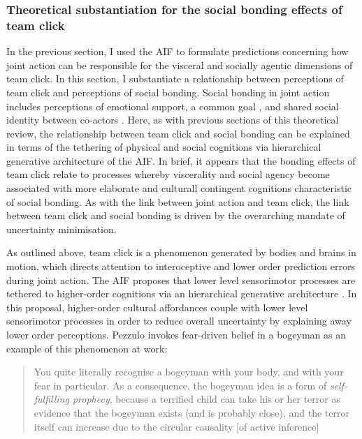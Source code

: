 \begin{CJK}{UTF8}{gbsn}
\subsubsection{Theoretical substantiation for the social bonding effects of team click}

In the previous section, I used the AIF to formulate predictions concerning how joint action can be responsible for the visceral and socially agentic dimensions of team click. In this section, I substantiate a relationship between perceptions of team click and perceptions of social bonding.  Social bonding in joint action includes perceptions of emotional support, a common goal \citep[see][]{Dunbar2012,Wolf2015}, and shared social identity between co-actors \citep{Whitehouse2014}.  Here, as with previous sections of this theoretical review, the relationship between team click and social bonding can be explained in terms of the tethering of physical and social cognitions via hierarchical generative architecture of the AIF.  In brief, it appears that the bonding effects of team click relate to processes whereby viscerality and social agency become associated with more elaborate and culturall contingent cognitions characteristic of social bonding.  As with the link between joint action and team click, the link between team click and social bonding is driven by the overarching mandate of uncertainty minimisation.

As outlined above, team click is a phenomenon generated by bodies and brains in motion, which directs attention to interoceptive and lower order prediction errors during joint action.  The AIF proposes that lower level sensorimotor processes are tethered to higher-order cognitions via an hierarchical generative architecture \citep{Ramstead2016}.  In this proposal, higher-order cultural affordances couple with lower level sensorimotor processes in order to reduce overall uncertainty by explaining away lower order perceptions.  Pezzulo invokes fear-driven belief in a bogeyman as an example of this phenomenon at work:

    \begin{quote}
      You quite literally recognise a bogeyman with your body, and with your fear in particular.  As a consequence, the bogeyman idea is a form of \textit{self-fulfilling prophecy}, because a terrified child can take his or her terror as evidence that the bogeyman exists (and is probably close), and the terror itself can increase due to the circular causality [of active inference] \citep[909]{Pezzulo2014}
    \end{quote}


\end{CJK}
